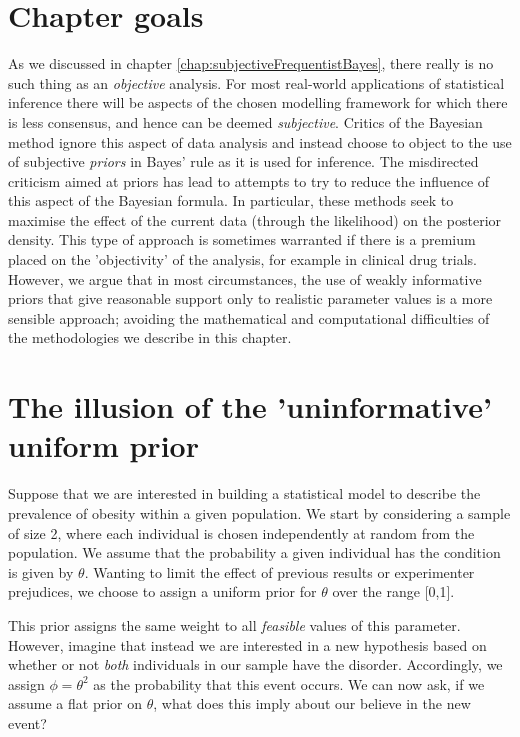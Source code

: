 \documentclass[11pt,fullpage]{book}
\begin{document}
\section{Chapter goals}
As we discussed in chapter \ref{chap:subjectiveFrequentistBayes}, there really is no such thing as an \textit{objective} analysis. For most real-world applications of statistical inference there will be aspects of the chosen modelling framework for which there is less consensus, and hence can be deemed \textit{subjective}. Critics of the Bayesian method ignore this aspect of data analysis and instead choose to object to the use of subjective \textit{priors} in Bayes' rule as it is used for inference. The misdirected criticism aimed at priors has lead to attempts to try to reduce the influence of this aspect of the Bayesian formula. In particular, these methods seek to maximise the effect of the current data (through the likelihood) on the posterior density. This type of approach is sometimes warranted if there is a premium placed on the 'objectivity' of the analysis, for example in clinical drug trials. However, we argue that in most circumstances, the use of weakly informative priors that give reasonable support only to realistic parameter values is a more sensible approach; avoiding the mathematical and computational difficulties of the methodologies we describe in this chapter.

\section{The illusion of the 'uninformative' uniform prior}\label{sec:Objective_illusionUniformUninform}
Suppose that we are interested in building a statistical model to describe the prevalence of obesity within a given population. We start by considering a sample of size 2, where each individual is chosen independently at random from the population. We assume that the probability a given individual has the condition is given by $\theta$. Wanting to limit the effect of previous results or experimenter prejudices, we choose to assign a uniform prior for $\theta$ over the range [0,1].

This prior assigns the same weight to all \textit{feasible} values of this parameter. However, imagine that instead we are interested in a new hypothesis based on whether or not \textit{both} individuals in our sample have the disorder. Accordingly, we assign $\phi=\theta^2$ as the probability that this event occurs. We can now ask, if we assume a flat prior on $\theta$, what does this imply about our believe in the new event?
\end{document}
